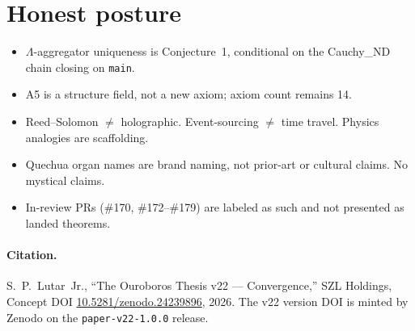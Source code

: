 \documentclass[11pt]{article}
\newcommand{\Lam}{\ensuremath{\Lambda}}
\begin{document}
\section{Honest posture}
\begin{itemize}\setlength\itemsep{0pt}
  \item \Lam-aggregator uniqueness is Conjecture~1, conditional on the Cauchy\_ND chain closing on \texttt{main}.
  \item A5 is a structure field, not a new axiom; axiom count remains 14.
  \item Reed--Solomon $\neq$ holographic. Event-sourcing $\neq$ time travel. Physics analogies are scaffolding.
  \item Quechua organ names are brand naming, not prior-art or cultural claims. No mystical claims.
  \item In-review PRs (\#170, \#172--\#179) are labeled as such and not presented as landed theorems.
\end{itemize}

\paragraph{Citation.} S.~P.~Lutar~Jr., ``The Ouroboros Thesis v22 --- Convergence,'' SZL Holdings,
Concept DOI \href{https://doi.org/10.5281/zenodo.24239896}{10.5281/zenodo.24239896}, 2026. The v22
version DOI is minted by Zenodo on the \texttt{paper-v22-1.0.0} release.



\end{document}
